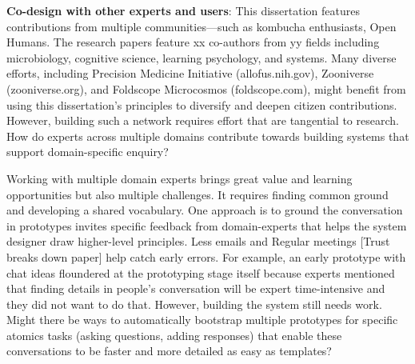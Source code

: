 
\textbf{Co-design with other experts and users}: This dissertation features contributions from multiple communities—such as kombucha enthusiasts, Open Humans. The research papers feature xx co-authors from yy fields including microbiology, cognitive science, learning psychology, and systems. Many diverse efforts, including Precision Medicine Initiative (allofus.nih.gov), Zooniverse (zooniverse.org), and Foldscope Microcosmos (foldscope.com), might benefit from using this dissertation’s principles to diversify and deepen citizen contributions. However, building such a network requires effort that are tangential to research. How do experts across multiple domains contribute towards building systems that support domain-specific enquiry? 

Working with multiple domain experts brings great value and learning opportunities but also multiple challenges. It requires finding common ground and developing a shared vocabulary. One approach is to ground the conversation in prototypes invites specific feedback from domain-experts that helps the system designer draw higher-level principles. Less emails and Regular meetings [Trust breaks down paper] help catch early errors. For example, an early prototype with chat ideas floundered at the prototyping stage itself because experts mentioned that finding details in people's conversation will be expert time-intensive and they did not want to do that. However, building the system still needs work. Might there be ways to automatically bootstrap multiple prototypes for specific atomics tasks (asking questions, adding responses) that enable these conversations to be faster and more detailed as easy as templates? 




